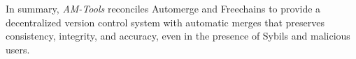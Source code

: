 \documentclass[12pt]{article}
\newcommand{\AMT}      {\emph{AM-Tools}\xspace}
\begin{document}
In summary, \AMT reconciles Automerge and Freechains to provide a decentralized
version control system with automatic merges that preserves consistency,
integrity, and accuracy, even in the presence of Sybils and malicious users.

\end{document}
